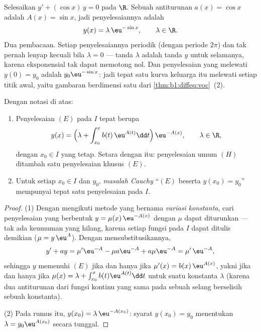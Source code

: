 \begin{example}\label{ex:b1:diffeq:varcoeff}
Selesaikan $y' + (\cos x)\,y = 0$ pada $\R$. Sebuah antiturunan $a(x) =
\cos x$ adalah $A(x) = \sin x$, jadi penyelesaiannya adalah
\[
y(x) = \lambda\,\eu^{-\sin x}, \qquad \lambda \in \R .
\]
Dua pembacaan. Setiap penyelesaiannya periodik (dengan periode $2\pi$) dan tak pernah
lenyap kecuali bila $\lambda = 0$ --- tanda $\lambda$ adalah
tanda $y$ untuk selamanya, karena eksponensial tak dapat memotong nol. Dan
penyelesaian yang melewati $y(0) = y_0$ adalah $y_0\eu^{-\sin x}$: jadi tepat
satu kurva keluarga itu melewati setiap titik awal, yaitu gambaran
berdimensi satu dari \cref{thm:b1:diffeq:voc}~(2).
\end{example}

\begin{theorem}\label{thm:b1:diffeq:voc}
Dengan notasi di atas:
\begin{enumerate}
  \item Penyelesaian $(E)$ pada $I$ tepat berupa
        \[
        y(x) = \Bigl(\lambda + \int_{x_0}^{x} b(t)\, \eu^{A(t)} \dd t
        \Bigr)\, \eu^{-A(x)},
        \qquad \lambda \in \R,
        \]
        dengan $x_0 \in I$ yang tetap. Setara dengan itu: penyelesaian umum
        $(H)$ ditambah satu penyelesaian khusus $(E)$.
  \item Untuk setiap $x_0 \in I$ dan $y_0$, \emph{masalah
        Cauchy} ``$(E)$ beserta $y(x_0) = y_0$''
        mempunyai tepat satu penyelesaian pada $I$.
\end{enumerate}
\end{theorem}

\begin{proof}
(1) Dengan mengikuti metode yang bernama \emph{variasi
konstanta}, cari penyelesaian yang
berbentuk $y = \mu(x)\, \eu^{-A(x)}$ dengan $\mu$ dapat diturunkan --- tak ada
keumuman yang hilang, karena setiap fungsi pada $I$ dapat ditulis demikian
($\mu = y\,\eu^{A}$). Dengan mensubstitusikannya,
\[
y' + ay = \mu' \eu^{-A} - \mu a \eu^{-A} + a\mu\eu^{-A}
= \mu'\, \eu^{-A},
\]
sehingga $y$ memenuhi $(E)$ jika dan hanya jika $\mu'(x) = b(x)\,\eu^{A(x)}$, yakni
jika dan hanya jika $\mu(x) = \lambda + \int_{x_0}^x b(t)\eu^{A(t)}\dd t$ untuk
suatu konstanta $\lambda$ (karena dua antiturunan dari fungsi kontinu yang sama
pada sebuah selang berselisih sebuah konstanta).

(2) Pada rumus itu, $y(x_0) = \lambda\,\eu^{-A(x_0)}$: syarat
$y(x_0) = y_0$ menentukan $\lambda = y_0 \eu^{A(x_0)}$ secara tunggal.
\end{proof}

